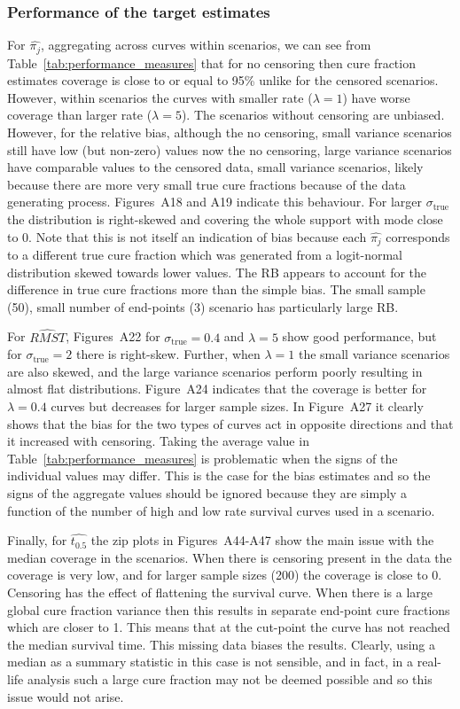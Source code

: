 \documentclass[AMA,STIX1COL]{WileyNJD-v2}
\begin{document}
\subsubsection{Performance of the target estimates}
For $\widehat{\pi_j}$, aggregating across curves within scenarios, we can see from Table~\ref{tab:performance_measures} that for no censoring  then cure fraction estimates coverage is close to or equal to 95\% unlike for the censored scenarios. However, within scenarios the curves with smaller rate ($\lambda=1$) have worse coverage than larger rate ($\lambda=5$). The scenarios without censoring are unbiased. However, for the relative bias, although the no censoring, small variance scenarios still have low (but non-zero) values now the no censoring, large variance scenarios have comparable values to the censored data, small variance scenarios, likely because there are more very small true cure fractions because of the data generating process.
Figures~A18 and A19 indicate this behaviour. For larger $\sigma_{\text{true}}$ the distribution is right-skewed and covering the whole support with mode close to 0. Note that this is not itself an indication of bias because each $\widehat{\pi_j}$ corresponds to a different true cure fraction which was generated from a logit-normal distribution skewed towards lower values. The RB appears to account for the difference in true cure fractions more than the simple bias. The small sample (50), small number of end-points (3) scenario has particularly large RB.

For $\widehat{RMST}$, Figures~A22 for $\sigma_{\text{true}} = 0.4$ and $\lambda = 5$ show good performance, but for $\sigma_{\text{true}} = 2$ there is right-skew. Further, when $\lambda = 1$ the small variance scenarios are also skewed, and the large variance scenarios perform poorly resulting in almost flat distributions. Figure~A24 indicates that the coverage is better for $\lambda = 0.4$ curves but decreases for larger sample sizes. In Figure~A27 it clearly shows that the bias for the two types of curves act in opposite directions and that it increased with censoring. Taking the average value in Table~\ref{tab:performance_measures} is problematic when the signs of the individual values may differ. This is the case for the bias estimates and so the signs of the aggregate values should be ignored because they are simply a function of the number of high and low rate survival curves used in a scenario.

Finally, for $\widehat{t_{0.5}}$ the zip plots in Figures~A44-A47 show the main issue with the median coverage in the scenarios. When there is censoring present in the data the coverage is very low, and for larger sample sizes (200) the coverage is close to 0. Censoring has the effect of flattening the survival curve. When there is a large global cure fraction variance then this results in separate end-point cure fractions which are closer to 1. This means that at the cut-point the curve has not reached the median survival time. This missing data biases the results. Clearly, using a median as a summary statistic in this case is not sensible, and in fact, in a real-life analysis such a large cure fraction may not be deemed possible and so this issue would not arise.  
\end{document}
